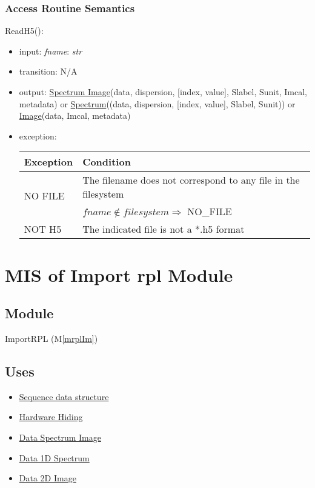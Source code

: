 \documentclass[12pt, titlepage]{article}
\newcommand{\mref}[1]{M\ref{#1}}
\begin{document}
\subsubsection{Access Routine Semantics}

\noindent ReadH5():
\begin{itemize}
    \item input: \textit{fname}: \textit{str}
    \item transition: N/A
    \item output: \hyperref[Mod:SI]{Spectrum Image}(data, dispersion, [index,
    value], Slabel, Sunit, Imcal, metadata) or
    \hyperref[Mod:Spectrum]{Spectrum}((data, dispersion, [index, value], Slabel,
    Sunit)) or \hyperref[Mod:Image]{Image}(data, Imcal, metadata)
    \item exception: 
    \begin{center}
        \begin{tabular}{p{3cm} p{12cm}}
            \toprule[0.15em]
            \textbf{Exception} & \textbf{Condition}\\
            \midrule[0.1em]
            \multirow{2}{0.25\textwidth}{NO FILE} & The filename does not
            correspond to any file in the filesystem\\ 
            & $fname \notin filesystem \Rightarrow$ NO\_FILE\\ 
            \midrule[0.05em]
            NOT H5 & The indicated file is not a *.h5 format\\
            \bottomrule[0.15em]
        \end{tabular}
    \end{center}
\end{itemize}

\newpage
\section{MIS of Import rpl Module} \label{Mod:ImportRPL}

\subsection{Module}

ImportRPL (\mref{mrplIm})

\subsection{Uses}
\begin{itemize}
    \item \hyperref[Mod:Seq]{Sequence data structure}
    \item \hyperref[Mod:HH]{Hardware Hiding}
    \item \hyperref[Mod:SI]{Data Spectrum Image}
    \item \hyperref[Mod:Spectrum]{Data 1D Spectrum}
    \item \hyperref[Mod:Image]{Data 2D Image}
\end{itemize}
\end{document}
